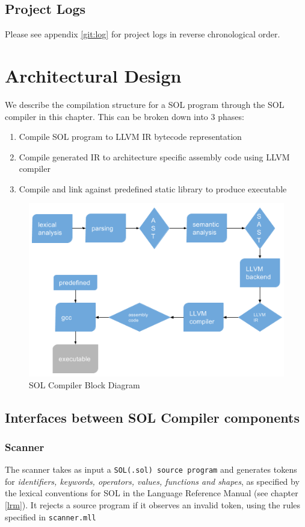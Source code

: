 \documentclass[letterpaper,12pt]{report}
\begin{document}
{  \section {Project Logs}
  Please see appendix \ref{git:log} for project logs in reverse chronological order.

\chapter{Architectural Design}
  We describe the compilation structure for a SOL program through the SOL compiler in this chapter. This can be broken down into 3 phases:
  \begin{enumerate}
    \itemsep 0em

    \item Compile SOL program to LLVM IR bytecode representation
    \item Compile generated IR to architecture specific assembly code using LLVM compiler
    \item Compile and link against predefined static library to produce executable
  \end{enumerate}

  \begin{figure}[ht]
    \includegraphics[scale=1]{compile-architecture.png}
    \caption{SOL Compiler Block Diagram}
  \end{figure}

  \section{Interfaces between SOL Compiler components}
    \subsection{Scanner}
      The scanner takes as input a \texttt{SOL(.sol) source program} and generates tokens for \textit{identifiers, keywords, operators, values, functions and shapes}, as specified by the lexical conventions for SOL in the Language Reference Manual (see chapter \ref{lrm}). It rejects a source program if it observes an invalid token, using the rules specified in \texttt{scanner.mll}

}
\end{document}
